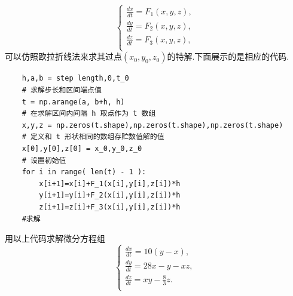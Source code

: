 \documentclass[a4paper]{article}%
\begin{document}
\begin{equation*}
        \begin{cases}
\frac{dx}{dt}=F_1(x,y,z),\\
\frac{dy}{dt}=F_2(x,y,z),\\
\frac{dz}{dt}=F_3(x,y,z),\\
\end{cases}
\end{equation*}
可以仿照欧拉折线法来求其过点$(x_0,y_0,z_0)$的特解.下面展示的是相应的代码.
\begin{verbatim}
    h,a,b = step length,0,t_0 
    # 求解步长和区间端点值
    t = np.arange(a, b+h, h)
    # 在求解区间内间隔 h 取点作为 t 数组
    x,y,z = np.zeros(t.shape),np.zeros(t.shape),np.zeros(t.shape)
    # 定义和 t 形状相同的数组存贮数值解的值
    x[0],y[0],z[0] = x_0,y_0,z_0
    # 设置初始值
    for i in range( len(t) - 1 ):
        x[i+1]=x[i]+F_1(x[i],y[i],z[i])*h
        y[i+1]=y[i]+F_2(x[i],y[i],z[i])*h
        z[i+1]=z[i]+F_3(x[i],y[i],z[i])*h
    #求解
\end{verbatim}


用以上代码求解微分方程组
\begin{equation*}
        \begin{cases}
\frac{dx}{dt}=10(y-x),\\
\frac{dy}{dt}=28x-y-xz,\\
\frac{dz}{dt}=xy-\frac{8}{3}z.\\
\end{cases}
\end{equation*}
\end{document}
